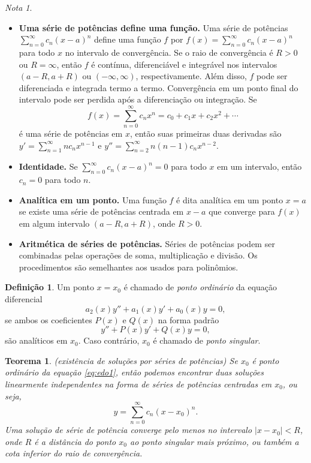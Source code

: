 \documentclass[12pt]{article}
\theoremstyle{plain}
\newtheorem{thm}{Teorema}[section]
\theoremstyle{definition}
\newtheorem{defn}{Definição}[section]
\theoremstyle{remark}
\newtheorem*{rem}{Nota}
\begin{document}
\begin{rem}
\begin{itemize}
        \item \textbf{Uma série de potências define uma função.} Uma série de potências \(\sum_{n=0}^{\infty} c_n (x-a)^n\) define uma função \(f\) por \( f(x) = \sum_{n=0}^{\infty} c_n (x-a)^n\) para todo \(x\) no intervalo de convergência. Se o raio de convergência é \(R>0\) ou \(R = \infty\), então \(f\) é contínua, diferenciável e integrável nos intervalos \((a-R, a+R)\) ou \((-\infty, \infty)\), respectivamente. Além disso, \(f\) pode ser diferenciada e integrada termo a termo. Convergência em um ponto final do intervalo pode ser perdida após a diferenciação ou integração. Se 
        \[ f(x) = \sum_{n=0}^{\infty} c_n x^n = c_0 + c_1 x + c_2 x^2 + \cdots \]
        \noindent é uma série de potências em \(x\), então suas primeiras duas derivadas são \( y' = \sum_{n=1}^{\infty} n c_n x^{n-1}\) e \( y'' = \sum_{n=2}^{\infty} n(n-1)c_n x^{n-2}\).
        \item \textbf{Identidade.} Se \(\sum_{n=0}^{\infty} c_n (x-a)^n = 0\) para todo \(x\) em um intervalo, então \(c_n = 0\) para todo \(n\).
        \item \textbf{Analítica em um ponto.} Uma função \(f\) é dita analítica em um ponto \(x=a\) se existe uma série de potências centrada em \(x-a\) que converge para \(f(x)\) em algum intervalo \((a-R, a+R)\), onde \(R>0\).
        \item \textbf{Aritmética de séries de potências.} Séries de potências podem ser combinadas pelas operações de soma, multiplicação e divisão. Os procedimentos são semelhantes aos usados para polinômios.
    \end{itemize}
\end{rem}

\begin{defn}
    Um ponto \(x=x_0\) é chamado de \emph{ponto ordinário} da equação diferencial
    \begin{equation}\label{eq:edo1}
        a_2(x)y'' + a_1(x)y' + a_0(x)y = 0,
    \end{equation}
    \noindent se ambos os coeficientes \(P(x)\) e \(Q(x)\) na forma padrão
    \begin{equation}\label{eq:edo2}
        y'' + P(x)y' + Q(x)y = 0,
    \end{equation}
\noindent são analíticos em \(x_0\). Caso contrário, \(x_0\) é chamado de \emph{ponto singular}.
\end{defn}

\begin{thm} (existência de soluções por séries de potências)
    Se \(x_0\) é ponto ordinário da equação \eqref{eq:edo1}, então podemos encontrar duas soluções linearmente independentes na forma de séries de potências centradas em \(x_0\), ou seja,
    \[
    y = \sum_{n=0}^{\infty} c_n (x - x_0)^n.
    \]
    Uma solução de série de potência converge pelo menos no intervalo \(|x - x_0| < R\), onde \(R\) é a distância do ponto \(x_0\) ao ponto singular mais próximo, ou também a \emph{cota inferior} do raio de convergência.
\end{thm}
\end{document}
